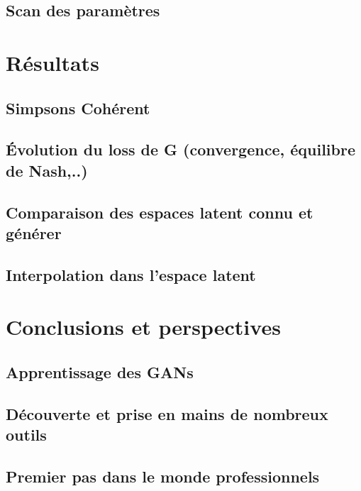 \documentclass[11pt]{article}
\begin{document}
\subsection{Scan des paramètres}

\section{Résultats}

\subsection{Simpsons Cohérent}
\subsection{Évolution du loss de G (convergence, équilibre de Nash,..)}
\subsection{Comparaison des espaces latent connu et générer}
\subsection{Interpolation dans l'espace latent}

\section{Conclusions et perspectives}

\subsection{Apprentissage des GANs}
\subsection{Découverte et prise en mains de nombreux outils}
\subsection{Premier pas dans le monde professionnels}

\newpage
\end{document}
